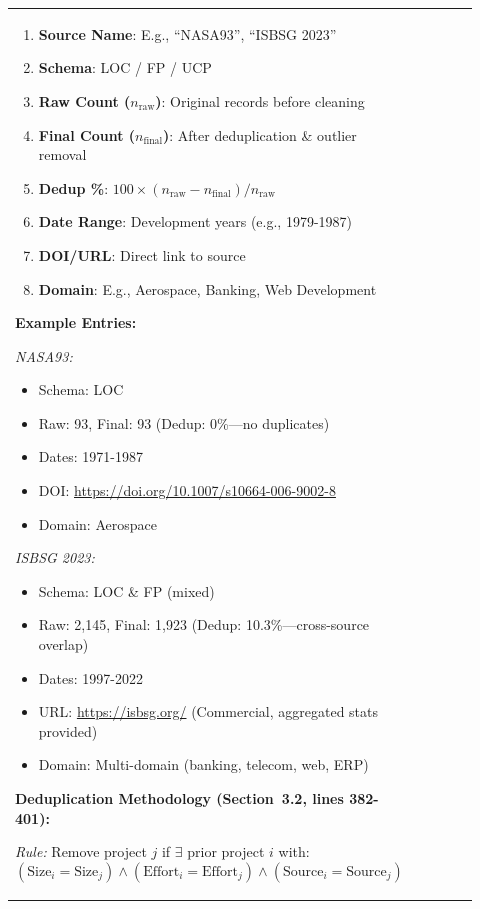 \documentclass[11pt,a4paper]{article}
\begin{document}
\begin{longtable}{>{\raggedright\arraybackslash}p{0.26\linewidth}|>{\raggedright\arraybackslash}p{0.44\linewidth}|>{\raggedright\arraybackslash}p{0.22\linewidth}}
\begin{enumerate}
    \item \textbf{Source Name}: E.g., ``NASA93'', ``ISBSG 2023''
    \item \textbf{Schema}: LOC / FP / UCP
    \item \textbf{Raw Count ($n_{\text{raw}}$)}: Original records before cleaning
    \item \textbf{Final Count ($n_{\text{final}}$)}: After deduplication \& outlier removal
    \item \textbf{Dedup \%}: $100 \times (n_{\text{raw}} - n_{\text{final}})/n_{\text{raw}}$
    \item \textbf{Date Range}: Development years (e.g., 1979-1987)
    \item \textbf{DOI/URL}: Direct link to source
    \item \textbf{Domain}: E.g., Aerospace, Banking, Web Development
\end{enumerate}

\textbf{Example Entries:}

\textit{NASA93:}
\begin{itemize}
    \item Schema: LOC
    \item Raw: 93, Final: 93 (Dedup: 0\%---no duplicates)
    \item Dates: 1971-1987
    \item DOI: \url{https://doi.org/10.1007/s10664-006-9002-8}
    \item Domain: Aerospace
\end{itemize}

\textit{ISBSG 2023:}
\begin{itemize}
    \item Schema: LOC \& FP (mixed)
    \item Raw: 2,145, Final: 1,923 (Dedup: 10.3\%---cross-source overlap)
    \item Dates: 1997-2022
    \item URL: \url{https://isbsg.org/} (Commercial, aggregated stats provided)
    \item Domain: Multi-domain (banking, telecom, web, ERP)
\end{itemize}

\textbf{Deduplication Methodology (Section~3.2, lines 382-401):}

\textit{Rule:} Remove project $j$ if $\exists$ prior project $i$ with:
$$(\text{Size}_i = \text{Size}_j) \land (\text{Effort}_i = \text{Effort}_j) \land (\text{Source}_i = \text{Source}_j)$$


\end{longtable}
\end{document}
